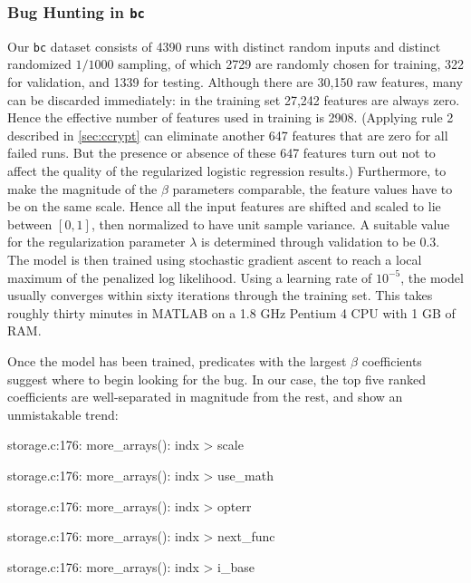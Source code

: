\subsubsection{Bug Hunting in \texttt{bc}}
Our \texttt{bc} dataset consists of 4390 runs with distinct random
inputs and distinct randomized $1/1000$ sampling, of which 2729 are
randomly chosen for training, 322 for validation, and 1339 for
testing.  Although there are 30,150 raw features, many can be
discarded immediately: in the training set 27,242 features are always
zero.  Hence the effective number of features used in training is
2908.  (Applying rule 2 described in \autoref{sec:ccrypt} can
eliminate another 647 features that are zero for all failed runs.  But
the presence or absence of these 647 features turn out not to affect
the quality of the regularized logistic regression results.)
Furthermore, to make the magnitude of the $\beta$ parameters
comparable, the feature values have to be on the same scale.  Hence
all the input features are shifted and scaled to lie between $[0,1]$,
then normalized to have unit sample variance.  A suitable value for
the regularization parameter $\lambda$ is determined through
validation to be $0.3$.  The model is then trained using stochastic
gradient ascent to reach a local maximum of the penalized log
likelihood.  Using a learning rate of $10^{-5}$, the model usually
converges within sixty iterations through the training set.  This
takes roughly thirty minutes in MATLAB on a 1.8 GHz Pentium 4 CPU with
1 GB of RAM.

Once the model has been trained, predicates with the largest $\beta$
coefficients suggest where to begin looking for the bug.  In our case,
the top five ranked coefficients are well-separated in magnitude from
the rest, and show an unmistakable trend:

\begin{list}{.}{\setlength{\itemsep}{0pt}\setlength{\parsep}{0in}\ttfamily\small}
\item storage.c:176: more\_arrays(): indx > scale
\item storage.c:176: more\_arrays(): indx > use\_math
\item storage.c:176: more\_arrays(): indx > opterr
\item storage.c:176: more\_arrays(): indx > next\_func
\item storage.c:176: more\_arrays(): indx > i\_base
\end{list}

